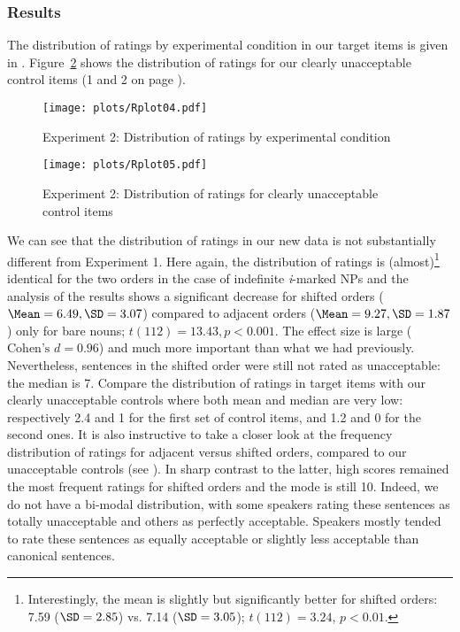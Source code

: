 \documentclass[output=paper]{langsci/langscibook}
\begin{document}
\subsubsection{Results}
The distribution of ratings by experimental condition in our target items is given in . Figure~\ref{boxplot2} shows the distribution of ratings for our clearly unacceptable control items (1 and 2 on page \pageref{ListFiller}).


\begin{figure}
	\texttt{[image: plots/Rplot04.pdf]}
	\caption{Experiment 2: Distribution of ratings by experimental condition}\label{boxplot1}
\end{figure}

\begin{figure}
    \texttt{[image: plots/Rplot05.pdf]}
	\caption{Experiment 2: Distribution of ratings for clearly unacceptable control items}\label{boxplot2}
\end{figure}

We can see that the distribution of ratings in our new data is not substantially different from Experiment 1.
Here again, the distribution of ratings is (almost)\footnote{Interestingly, the mean is slightly but significantly better for shifted orders: 7.59 ($\SD=2.85$) vs. 7.14 ($\SD=3.05$); $t(112)=3.24$, $p<0.01$.} identical for the two orders in the case of indefinite \textit{i}-marked NPs and the analysis of the results shows a significant decrease for shifted orders ($\Mean=6.49, \SD=3.07$) compared to adjacent orders ($\Mean=9.27, \SD=1.87$) only for bare nouns; $t(112)=13.43, p<0.001$. The effect size is large ($\text{Cohen's } d=0.96$) and much more important than what we had previously. Nevertheless, sentences in the shifted order were still not rated as unacceptable: the median  is 7. Compare the distribution of ratings in target items with our clearly unacceptable controls where both mean and median are very low: respectively 2.4 and 1 for the first set of control items, and 1.2 and 0 for the second ones.
It is also instructive to take a closer look at the frequency distribution of ratings for adjacent versus shifted orders, compared to our unacceptable controls (see ).  In sharp contrast to the latter, high scores remained the most frequent ratings for shifted orders and the mode is still 10.
Indeed, we do not have a bi-modal distribution, with some speakers rating these sentences as totally unacceptable and others as perfectly acceptable. Speakers mostly tended to rate these sentences as equally acceptable or slightly less acceptable than canonical sentences.
\end{document}
